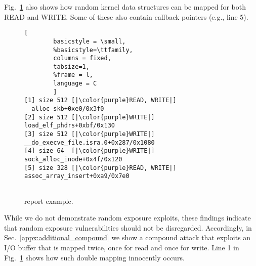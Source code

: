 Fig.~\ref{fig:dkasan-report} also shows how random kernel data structures can be mapped for both READ and WRITE. Some of these also contain callback pointers (e.g., line 5). 

%
\begin{figure}[t]
\begin{adjustbox}{width=0.9\linewidth}
        \begin{lstlisting}[
        basicstyle = \small,
        %basicstyle=\ttfamily,
        columns = fixed,
        tabsize=1,
        %frame = l,
        language = C
        ]
[1] size 512 [|\color{purple}READ, WRITE|] __alloc_skb+0xe0/0x3f0
[2] size 512 [|\color{purple}WRITE|] load_elf_phdrs+0xbf/0x130
[3] size 512 [|\color{purple}WRITE|] __do_execve_file.isra.0+0x287/0x1080
[4] size 64  [|\color{purple}WRITE|] sock_alloc_inode+0x4f/0x120
[5] size 328 [|\color{purple}READ, WRITE|] assoc_array_insert+0xa9/0x7e0
        
\end{lstlisting}
\end{adjustbox}
        \caption{\dkasan report example.}
        \label{fig:dkasan-report}
\end{figure}

While we do not demonstrate random exposure exploits, these findings indicate that random exposure vulnerabilities should not be disregarded. Accordingly, in Sec.~\ref{appx:additional_compound} we show a compound attack that exploits an I/O buffer that is mapped twice, once for read and once for write. Line 1 in Fig.~\ref{fig:dkasan-report}  shows how such double mapping innocently occurs.

